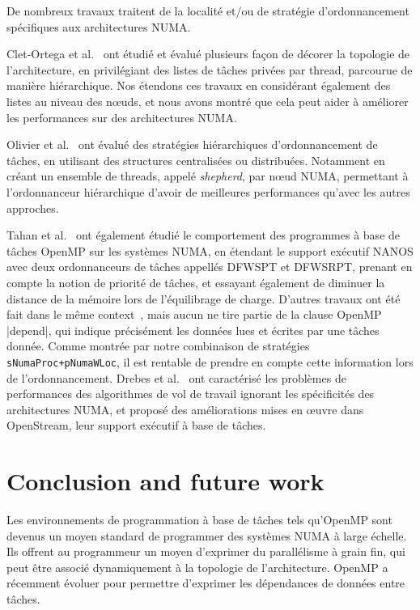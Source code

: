 \documentclass[parallelisme]{compas2016}
\begin{document}
De nombreux travaux traitent de la localité et/ou de stratégie d'ordonnancement
spécifiques aux architectures NUMA.

Clet-Ortega et al.~\cite{DBLP:conf/europar/Clet-OrtegaCP14} ont étudié et évalué plusieurs
façon de décorer la topologie de l'architecture, en privilégiant des listes de tâches
privées par thread, parcourue de manière hiérarchique. Nos étendons ces travaux
en considérant également des listes au niveau des nœuds, et nous avons montré
que cela peut aider à améliorer les performances sur des architectures NUMA.

Olivier et al.~\cite{DBLP:journals/ijhpca/OlivierPWSP12} ont évalué des stratégies
hiérarchiques d'ordonnancement de tâches, en utilisant des structures centralisées
ou distribuées. Notamment en créant un ensemble de threads, appelé \emph{shepherd}, par
nœud NUMA, permettant à l'ordonnanceur hiérarchique d'avoir de meilleures performances
qu'avec les autres approches.

Tahan et al.~\cite{DBLP:journals/corr/Tahan14} ont également étudié le comportement
des programmes à base de tâches OpenMP sur les systèmes NUMA, en étendant le
support exécutif NANOS avec deux ordonnanceurs de tâches appellés DFWSPT et DFWSRPT,
prenant en compte la notion de priorité de tâches, et essayant également de diminuer
la distance de la mémoire lors de l'équilibrage de charge.
D'autres travaux ont été fait dans le même context~\cite{DBLP:conf/europar/TerbovenSCM12,DBLP:journals/corr/abs-1101-0093},
mais aucun ne tire partie de la clause OpenMP |depend|, qui indique précisément les
données lues et écrites par une tâches donnée. Comme montrée par notre combinaison
de stratégies \verb/sNumaProc+pNumaWLoc/, il est rentable de prendre en compte
cette information lors de l'ordonnancement.
Drebes et al.~\cite{LIP610333} ont caractérisé les problèmes de performances des
algorithmes de vol de travail ignorant les spécificités des architectures NUMA,
et proposé des améliorations mises en œuvre dans OpenStream, leur support exécutif à base de tâches.


\section{Conclusion and future work}

Les environnements de programmation à base de tâches tels qu'OpenMP sont devenus
un moyen standard de programmer des systèmes NUMA à large échelle.
Ils offrent au programmeur un moyen d'exprimer du parallélisme à grain fin,
qui peut être associé dynamiquement à la topologie de l'architecture.
OpenMP a récemment évoluer pour permettre d'exprimer les dépendances de données
entre tâches.
\end{document}
